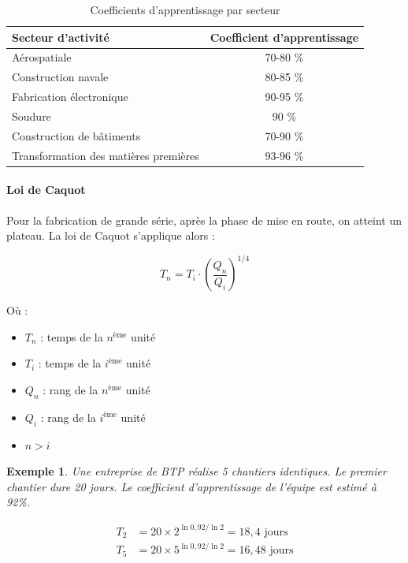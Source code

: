 \documentclass[a4paper,12pt]{article}
\newtheorem{exemple}{Exemple}[section]
\begin{document}
\begin{table}[ht]
\centering
\begin{tabular}{|l|c|}
\hline
\textbf{Secteur d'activité} & \textbf{Coefficient d'apprentissage} \\
\hline
Aérospatiale & 70-80 \% \\
Construction navale & 80-85 \% \\
Fabrication électronique & 90-95 \% \\
Soudure & 90 \% \\
Construction de bâtiments & 70-90 \% \\
Transformation des matières premières & 93-96 \% \\
\hline
\end{tabular}
\caption{Coefficients d'apprentissage par secteur}
\end{table}

\paragraph{Loi de Caquot}

Pour la fabrication de grande série, après la phase de mise en route, on atteint un plateau. La loi de Caquot s'applique alors :

\[
T_n = T_i \cdot \left(\frac{Q_n}{Q_i}\right)^{1/4}
\]

Où :
\begin{itemize}
    \item $T_n$ : temps de la $n^{\text{ème}}$ unité
    \item $T_i$ : temps de la $i^{\text{ème}}$ unité
    \item $Q_n$ : rang de la $n^{\text{ème}}$ unité
    \item $Q_i$ : rang de la $i^{\text{ème}}$ unité
    \item $n > i$
\end{itemize}

\begin{exemple}
Une entreprise de BTP réalise 5 chantiers identiques. Le premier chantier dure 20 jours. Le coefficient d'apprentissage de l'équipe est estimé à 92\%.

\begin{align*}
T_2 &= 20 \times 2^{\ln 0,92 / \ln 2} = 18,4 \text{ jours} \\
T_5 &= 20 \times 5^{\ln 0,92 / \ln 2} = 16,48 \text{ jours}
\end{align*}
\end{exemple}
\end{document}
